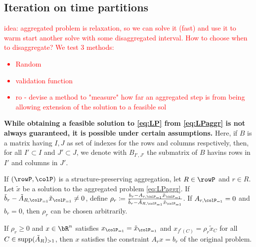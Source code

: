 
\subsection{Iteration on time partitions}
\textcolor{red}{idea: aggregated problem is relaxation, so we can solve it (fast) and use it to warm start another solve with some disaggregated interval. How to choose when to disaggregate? We test 3 methods:
\begin{itemize}
\item Random
\item validation function
\item ro - devise a method to "measure" how far an aggregated step is from being allowing extension of the solution to a feasible sol
\end{itemize}
}
\color{gray}
\textbf{While obtaining a feasible solution to \eqref{eq:LP} from \eqref{eq:LPaggr} is not always guaranteed, it is possible under certain assumptions.}
Here, if \(B\) is a matrix having \(I,J\) as set of indexes for the rows and columns respctively, then, for all \(I' \subset I\) and \(J' \subset J\), we denote with \(B_{I',J'}\) the submatrix of \(B\) havins rows in \(I'\) and columns in \(J'\).
\begin{observation}
\label{ob:aggrconstr}
If \((\rowP, \colP)\) is a structure-preserving aggregation, let \(R \in \rowP\) and \(r \in R\). Let \(\tilde{x}\) be a solution to the aggregated problem \eqref{eq:LPaggr}. If \(\tilde{b}_r - \tilde{A}_{R, \colP_{=1}} \tilde{x}_{\colP_{=1}} \neq 0\), define \(\rho_r \coloneqq \frac{b_r - A_{r, \colP_{=1}} \tilde{x}_{\colP_{=1}}}{\tilde{b}_r
 - \tilde{A}_{R, \colP_{=1}} \tilde{x}_{\colP_{=1}}}\). If \(A_{r, \colP_{=1}} = 0\) and \(b_r = 0\), then \(\rho_r\) can be chosen arbitrarily. 

If \(\rho_r \geq 0\) and \(x \in \bR^n\) satisfies \(x_{\colP_{=1}} = \tilde{x}_{\colP_{=1}}\) and \(x_{f^r(C)} = \rho_r \tilde{x}_C\) for all \(C \in \operatorname{supp}(\tilde{A}_R)_{>1}\), then \(x\) satisfies the constraint \(A_r x = b_r\) of the original problem.
\end{observation}

